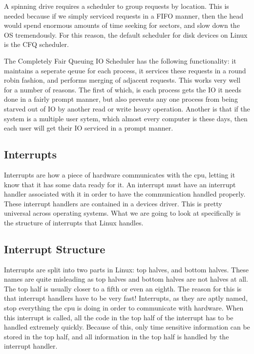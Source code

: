   A spinning drive requires a scheduler to group requests by location. This is
  needed because if we simply serviced requests in a FIFO manner, then the head
  would spend enormous amounts of time seeking for sectors, and slow down \cite{internals2}the OS
  tremendously. For this reason, the default scheduler for disk devices on Linux
  is the CFQ scheduler.

  The Completely Fair Queuing IO Scheduler has the following functionality: it
  maintains a seperate qeuue for each process, it services these requests in a round
  robin fashion, and performs merging of adjacent requests. This works very well
  for a number of reasons. The first of which, is each process gets the IO it needs
  done in a fairly prompt manner, but also prevents any one process from being
  starved out of IO by another read or write heavy operation. Another is that
  if the system is a multiple user sytem, which almost every computer is these
  days, then each user will get their IO serviced in a prompt manner. \cite{robertlove2010}

  \subsection{Interrupts}
  Interrupts are how a piece of hardware communicates with the cpu, letting it
  know that it has some data ready for it. An interrupt must have an interrupt
  handler associated with it in order to have the communication handled properly.
  These interrupt handlers are contained in a devices driver. This is pretty
  universal across operating systems. What we are going to look at specifically
  is the structure of interrupts that Linux handles. \cite{robertlove2010}

  \subsection{Interrupt Structure}
  Interrupts are split into two parts in Linux: top halves, and bottom halves.
  These names are quite misleading as top halves and bottom halves are not halves
  at all. The top half is usually closer to a fifth or even an eighth. The reason
  for this is that interrupt handlers have to be very fast! Interrupts, as they
  are aptly named, stop everything the cpu is doing in order to communicate with
  hardware. When this interrupt is called, all the code in the top half of the
  interrupt has to be handled extremely quickly. Because of this, only time sensitive
  information can be stored in the top half, and all information in the top half
  is handled by the interrupt handler.

